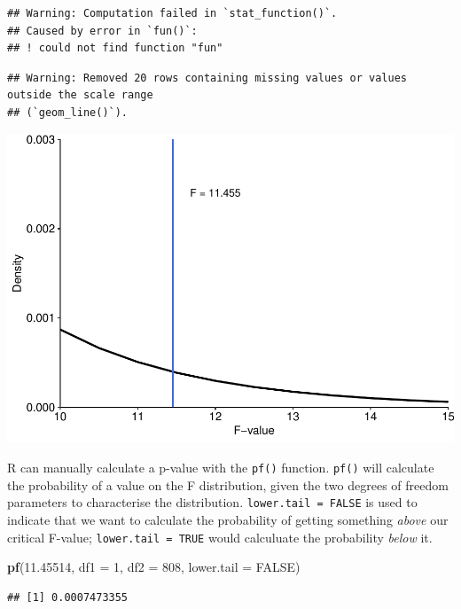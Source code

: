 \documentclass[
]{book}
\newenvironment{Shaded}{\begin{snugshade}}{\end{snugshade}}
\newcommand{\AttributeTok}[1]{\textcolor[rgb]{0.13,0.29,0.53}{#1}}
\newcommand{\ConstantTok}[1]{\textcolor[rgb]{0.56,0.35,0.01}{#1}}
\newcommand{\DecValTok}[1]{\textcolor[rgb]{0.00,0.00,0.81}{#1}}
\newcommand{\FloatTok}[1]{\textcolor[rgb]{0.00,0.00,0.81}{#1}}
\newcommand{\FunctionTok}[1]{\textcolor[rgb]{0.13,0.29,0.53}{\textbf{#1}}}
\newcommand{\NormalTok}[1]{#1}
\begin{document}
\begin{verbatim}
## Warning: Computation failed in `stat_function()`.
## Caused by error in `fun()`:
## ! could not find function "fun"
\end{verbatim}

\begin{verbatim}
## Warning: Removed 20 rows containing missing values or values outside the scale range
## (`geom_line()`).
\end{verbatim}

\includegraphics{_main_files/figure-latex/unnamed-chunk-391-1.pdf}

R can manually calculate a p-value with the \texttt{pf()} function. \texttt{pf()} will calculate the probability of a value on the F distribution, given the two degrees of freedom parameters to characterise the distribution. \texttt{lower.tail\ =\ FALSE} is used to indicate that we want to calculate the probability of getting something \emph{above} our critical F-value; \texttt{lower.tail\ =\ TRUE} would calculuate the probability \emph{below} it.

\begin{Shaded}
\begin{Highlighting}[]
\FunctionTok{pf}\NormalTok{(}\FloatTok{11.45514}\NormalTok{, }\AttributeTok{df1 =} \DecValTok{1}\NormalTok{, }\AttributeTok{df2 =} \DecValTok{808}\NormalTok{, }\AttributeTok{lower.tail =} \ConstantTok{FALSE}\NormalTok{)}
\end{Highlighting}
\end{Shaded}

\begin{verbatim}
## [1] 0.0007473355
\end{verbatim}
\end{document}
